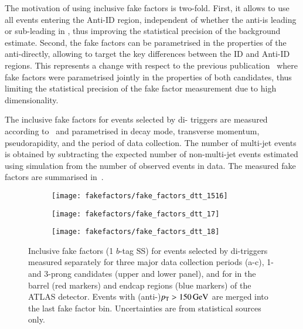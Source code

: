 {  The motivation of using inclusive fake factors is two-fold. First,
  it allows to use all events entering the Anti-ID region, independent
  of whether the anti-\tauhadvis is leading or sub-leading in \pT,
  thus improving the statistical precision of the background
  estimate. Second, the fake factors can be parametrised in the
  properties of the anti-\tauhadvis directly, allowing to target the
  key differences between the ID and Anti-ID regions. This represents
  a change with respect to the previous
  publication~\cite{HIGG-2016-16-witherratum} where fake factors were
  parametrised jointly in the properties of both \tauhadvis
  candidates, thus limiting the statistical precision of the fake
  factor measurement due to high dimensionality.

}

The inclusive fake factors for events selected by di-\tauhadvis
triggers are measured according to~ and
parametrised in \tauhadvis decay mode, transverse momentum,
pseudorapidity, and the period of data collection. The number of
multi-jet events is obtained by subtracting the expected number of
non-multi-jet events estimated using simulation from the number of
observed events in data. The measured fake factors are summarised
in~.

\begin{figure}[htbp]
  \centering

  \begin{subfigure}{0.495\textwidth}
    \texttt{[image: fakefactors/fake\_factors\_dtt\_1516]}
  \end{subfigure}
  \begin{subfigure}{0.495\textwidth}
    \texttt{[image: fakefactors/fake\_factors\_dtt\_17]}
  \end{subfigure}

  \begin{subfigure}{0.495\textwidth}
    \texttt{[image: fakefactors/fake\_factors\_dtt\_18]}
  \end{subfigure}

  \caption{Inclusive fake factors (1 $b$-tag SS) for events selected
    by di-\tauhadvis triggers measured separately for three major data
    collection periods (a-c), 1- and 3-prong \tauhadvis candidates
    (upper and lower panel), and for \tauhadvis in the barrel (red
    markers) and endcap regions (blue markers) of the ATLAS
    detector. Events with (anti-)\tauhadvis $p_{\text{T}} > \SI{150}{\ensuremath{\text{GeV}}}$ are
    merged into the last fake factor bin. Uncertainties are from
    statistical sources only.}
  \label{fig:mjfakes_fake_factors}
\end{figure}

